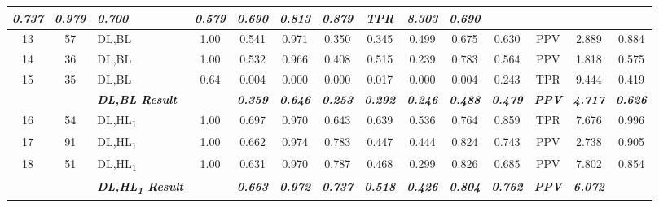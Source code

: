 \begin{table}[H]
{\begin{tabular}{cc|l|c|c|c|c|c|c|c|c|c|c|c|}
    \textit{\textbf{0.737}} &
    \textit{\textbf{0.979}} &
    \textit{\textbf{0.700}} &
    \textit{\textbf{0.579}} &
    \textit{\textbf{0.690}} &
    \textit{\textbf{0.813}} &
    \textit{\textbf{0.879}} &
    \textit{\textbf{TPR}} &
    \textit{\textbf{8.303}} &
    \textit{\textbf{0.690}} \\ \hline
  \multicolumn{1}{|c|}{13} &
    57 &
    DL,BL &
    1.00 &
    0.541 &
    0.971 &
    0.350 &
    0.345 &
    0.499 &
    0.675 &
    0.630 &
    PPV &
    2.889 &
    0.884 \\ \hline
  \multicolumn{1}{|c|}{14} &
    36 &
    DL,BL &
    1.00 &
    0.532 &
    0.966 &
    0.408 &
    0.515 &
    0.239 &
    0.783 &
    0.564 &
    PPV &
    1.818 &
    0.575 \\ \hline
  \multicolumn{1}{|c|}{15} &
    35 &
    DL,BL &
    0.64 &
    0.004 &
    0.000 &
    0.000 &
    0.017 &
    0.000 &
    0.004 &
    0.243 &
    TPR &
    9.444 &
    0.419 \\ \hline
  \textit{\textbf{}} &
    \textit{\textbf{}} &
    \textit{\textbf{DL,BL Result}} &
    \textit{\textbf{}} &
    \textit{\textbf{0.359}} &
    \textit{\textbf{0.646}} &
    \textit{\textbf{0.253}} &
    \textit{\textbf{0.292}} &
    \textit{\textbf{0.246}} &
    \textit{\textbf{0.488}} &
    \textit{\textbf{0.479}} &
    \textit{\textbf{PPV}} &
    \textit{\textbf{4.717}} &
    \textit{\textbf{0.626}} \\ \hline
  \multicolumn{1}{|c|}{16} &
    54 &
    DL,HL\textsubscript{1} &
    1.00 &
    0.697 &
    0.970 &
    0.643 &
    0.639 &
    0.536 &
    0.764 &
    0.859 &
    TPR &
    7.676 &
    0.996 \\ \hline
  \multicolumn{1}{|c|}{17} &
    91 &
    DL,HL\textsubscript{1} &
    1.00 &
    0.662 &
    0.974 &
    0.783 &
    0.447 &
    0.444 &
    0.824 &
    0.743 &
    PPV &
    2.738 &
    0.905 \\ \hline
  \multicolumn{1}{|c|}{18} &
    51 &
    DL,HL\textsubscript{1} &
    1.00 &
    0.631 &
    0.970 &
    0.787 &
    0.468 &
    0.299 &
    0.826 &
    0.685 &
    PPV &
    7.802 &
    0.854 \\ \hline
  \textit{\textbf{}} &
    \textit{\textbf{}} &
    \textit{\textbf{DL,HL\textsubscript{1} Result}} &
    \textit{\textbf{}} &
    \textit{\textbf{0.663}} &
    \textit{\textbf{0.972}} &
    \textit{\textbf{0.737}} &
    \textit{\textbf{0.518}} &
    \textit{\textbf{0.426}} &
    \textit{\textbf{0.804}} &
    \textit{\textbf{0.762}} &
    \textit{\textbf{PPV}} &
    \textit{\textbf{6.072}} &

\end{tabular}}
\end{table}

